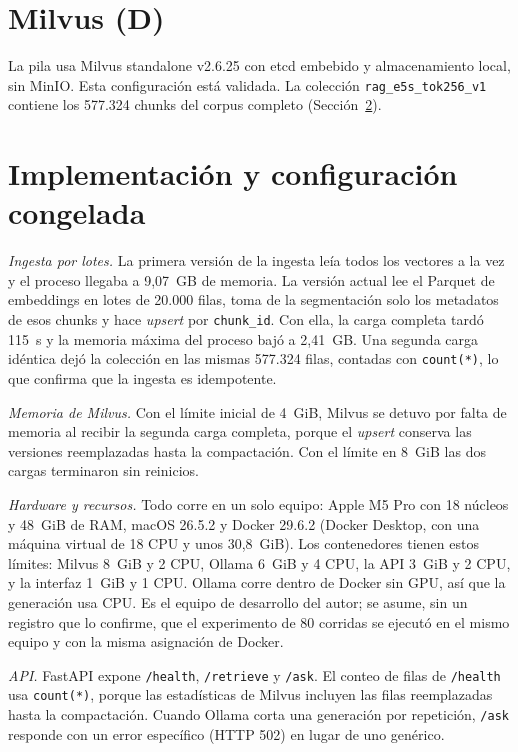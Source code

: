 \documentclass[conference]{IEEEtran}
\begin{document}
\section{Milvus (D)}
La pila usa Milvus standalone v2.6.25 con etcd embebido y almacenamiento local, sin MinIO. Esta configuración está validada. La colección \texttt{rag\_e5s\_tok256\_v1} contiene los 577.324 chunks del corpus completo (Sección~\ref{sec:implementacion}).

\section{Implementación y configuración congelada}
\label{sec:implementacion}
\textit{Ingesta por lotes.} La primera versión de la ingesta leía todos los vectores a la vez y el proceso llegaba a 9,07~GB de memoria. La versión actual lee el Parquet de embeddings en lotes de 20.000 filas, toma de la segmentación solo los metadatos de esos chunks y hace \textit{upsert} por \texttt{chunk\_id}. Con ella, la carga completa tardó 115~s y la memoria máxima del proceso bajó a 2,41~GB. Una segunda carga idéntica dejó la colección en las mismas 577.324 filas, contadas con \texttt{count(*)}, lo que confirma que la ingesta es idempotente.

\textit{Memoria de Milvus.} Con el límite inicial de 4~GiB, Milvus se detuvo por falta de memoria al recibir la segunda carga completa, porque el \textit{upsert} conserva las versiones reemplazadas hasta la compactación. Con el límite en 8~GiB las dos cargas terminaron sin reinicios.

\textit{Hardware y recursos.} Todo corre en un solo equipo: Apple M5 Pro con 18 núcleos y 48~GiB de RAM, macOS 26.5.2 y Docker 29.6.2 (Docker Desktop, con una máquina virtual de 18 CPU y unos 30,8~GiB). Los contenedores tienen estos límites: Milvus 8~GiB y 2 CPU, Ollama 6~GiB y 4 CPU, la API 3~GiB y 2 CPU, y la interfaz 1~GiB y 1 CPU. Ollama corre dentro de Docker sin GPU, así que la generación usa CPU. Es el equipo de desarrollo del autor; se asume, sin un registro que lo confirme, que el experimento de 80 corridas se ejecutó en el mismo equipo y con la misma asignación de Docker.

\textit{API.} FastAPI expone \texttt{/health}, \texttt{/retrieve} y \texttt{/ask}. El conteo de filas de \texttt{/health} usa \texttt{count(*)}, porque las estadísticas de Milvus incluyen las filas reemplazadas hasta la compactación. Cuando Ollama corta una generación por repetición, \texttt{/ask} responde con un error específico (HTTP 502) en lugar de uno genérico.
\end{document}
